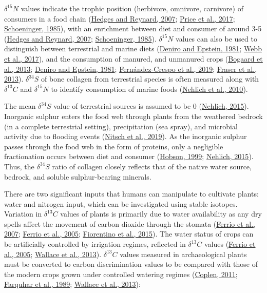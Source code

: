 \documentclass[preprint, 3p, authoryear]{elsarticle} %
\begin{document}
\(\delta ^{15}N\) values indicate the trophic position (herbivore, omnivore, carnivore) of consumers in a food chain (\protect\hyperlink{ref-hedges_reynard07}{Hedges and Reynard, 2007}; \protect\hyperlink{ref-price_etal17}{Price et al., 2017}; \protect\hyperlink{ref-schoeninger85}{Schoeninger, 1985}), with an enrichment between diet and consumer of around 3-5\text{\textperthousand} (\protect\hyperlink{ref-hedges_reynard07}{Hedges and Reynard, 2007}; \protect\hyperlink{ref-schoeninger85}{Schoeninger, 1985}). \(\delta ^{15}N\) values can also be used to distinguish between terrestrial and marine diets (\protect\hyperlink{ref-deniro_epstein81}{Deniro and Epstein, 1981}; \protect\hyperlink{ref-webb_etal17a}{Webb et al., 2017}), and the consumption of manured, and unmanured crops (\protect\hyperlink{ref-bogaard_etal13}{Bogaard et al., 2013}; \protect\hyperlink{ref-deniro_epstein81}{Deniro and Epstein, 1981}; \protect\hyperlink{ref-fernandez-crespo_etal19}{Fernández-Crespo et al., 2019}; \protect\hyperlink{ref-fraser_etal13a}{Fraser et al., 2013}). \(\delta ^{34}S\) of bone collagen from terrestrial species is often measured along with \(\delta ^{13}C\) and \(\delta ^{15}N\) to identify consumption of marine foods (\protect\hyperlink{ref-nehlich_etal10}{Nehlich et al., 2010}).

The mean \(\delta ^{34}S\) value of terrestrial sources is assumed to be 0\text{\textperthousand} (\protect\hyperlink{ref-nehlich15}{Nehlich, 2015}). Inorganic sulphur enters the food web through plants from the weathered bedrock (in a complete terrestrial setting), precipitation (sea spray), and microbial activity due to flooding events (\protect\hyperlink{ref-nitsch_etal19}{Nitsch et al., 2019}). As the inorganic sulphur passes through the food web in the form of proteins, only a negligible fractionation occurs between diet and consumer (\protect\hyperlink{ref-hobson99}{Hobson, 1999}; \protect\hyperlink{ref-nehlich15}{Nehlich, 2015}). Thus, the \(\delta ^{34}S\) ratio of collagen closely reflects that of the native water source, bedrock, and soluble sulphur-bearing minerals.

There are two significant inputs that humans can manipulate to cultivate plants: water and nitrogen input, which can be investigated using stable isotopes. Variation in \(\delta ^{13}C\) values of plants is primarily due to water availability as any dry spells affect the movement of carbon dioxide through the stomata (\protect\hyperlink{ref-ferrio_etal07}{Ferrio et al., 2007}; \protect\hyperlink{ref-ferrio_etal05}{Ferrio et al., 2005}; \protect\hyperlink{ref-fiorentino_etal15}{Fiorentino et al., 2015}). The water status of crops can be artificially controlled by irrigation regimes, reflected in \(\delta ^{13}C\) values (\protect\hyperlink{ref-ferrio_etal05}{Ferrio et al., 2005}; \protect\hyperlink{ref-wallace_etal13}{Wallace et al., 2013}). \(\delta ^{13}C\) values measured in archaeological plants must be converted to carbon discrimination values to be compared with those of the modern crops grown under controlled watering regimes (\protect\hyperlink{ref-coplen11}{Coplen, 2011}; \protect\hyperlink{ref-farquhar_etal89}{Farquhar et al., 1989}; \protect\hyperlink{ref-wallace_etal13}{Wallace et al., 2013}):
\end{document}
